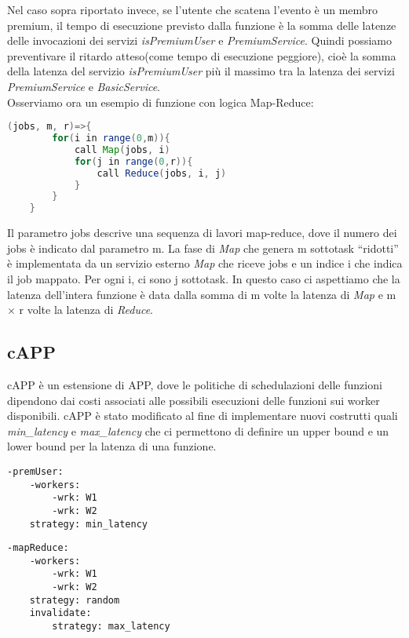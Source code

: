 \documentclass[../../main.tex]{subfiles}
\begin{document}
Nel caso sopra riportato invece, se l'utente che scatena l'evento è un membro premium, il tempo di esecuzione previsto dalla funzione è la somma delle latenze delle invocazioni dei servizi \textit{isPremiumUser} e \textit{PremiumService}.
Quindi possiamo preventivare il ritardo atteso(come tempo di esecuzione peggiore), cioè la somma della latenza del servizio \textit{isPremiumUser} più il massimo tra la latenza dei servizi \textit{PremiumService} e \textit{BasicService}.\\
Osserviamo ora un esempio di funzione con logica Map-Reduce:

\begin{lstlisting}[language=Java, caption=Funzione con logica Map-Reduce,label={lst:3}]
    (jobs, m, r)=>{
        for(i in range(0,m)){
            call Map(jobs, i)
            for(j in range(0,r)){
                call Reduce(jobs, i, j)
            }
        }
    }
\end{lstlisting}
Il parametro jobs descrive una sequenza di lavori map-reduce, dove il numero dei jobs è indicato dal parametro m.
La fase di \textit{Map} che genera m sottotask ``ridotti'' è implementata da un servizio esterno \textit{Map} che riceve jobs e un indice i che indica il job mappato.
Per ogni i, ci sono j sottotask.
In questo caso ci aspettiamo che la latenza dell'intera funzione è data dalla somma di m volte la latenza di \textit{Map} e m $\times $ r volte la latenza di \textit{Reduce}.\autocite{de2023custom}\\
\subsection{cAPP}
\label{cApp}
cAPP è un estensione di APP, dove le politiche di schedulazioni delle funzioni dipendono dai costi associati alle possibili esecuzioni delle funzioni sui worker disponibili.
\autocite {deserverless}
cAPP è stato modificato al fine di implementare nuovi costrutti quali \textit{min\_latency} e \textit{max\_latency} che ci permettono di definire un upper bound e un lower bound per la latenza di una funzione.
\begin{multicols}{2}
    \begin{lstlisting}[caption={cAPP for Listing \ref{lst:1} e \ref{lst:2}},label={lst:4}]
-premUser:
    -workers:
        -wrk: W1
        -wrk: W2
    strategy: min_latency
    \end{lstlisting}
    \columnbreak
    \begin{lstlisting}[caption={cAPP for Listing~\ref{lst:3}}, label={lst:5}]
-mapReduce:
    -workers:
        -wrk: W1
        -wrk: W2
    strategy: random
    invalidate:
        strategy: max_latency
    \end{lstlisting}
\end{multicols}
\end{document}
